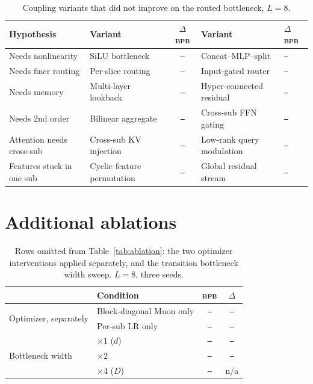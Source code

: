 \documentclass{article}
\newcommand{\PH}{{\color{red}\texttt{--}}}   %
\newcommand{\bpb}{\textsc{bpb}}
\newcommand{\dmodel}{D}
\newcommand{\dsub}{d}
\begin{document}
\begin{table}[h]
\caption{Coupling variants that did not improve on the routed bottleneck, $L{=}8$.}
\label{tab:negative}
\begin{center}
\begin{small}
\setlength{\tabcolsep}{4pt}
\begin{tabular}{llcll}
\toprule
Hypothesis & Variant & $\Delta$ \bpb & Variant & $\Delta$ \bpb \\
\midrule
Needs nonlinearity   & SiLU bottleneck & \PH & Concat--MLP--split & \PH \\
Needs finer routing  & Per-slice routing & \PH & Input-gated router & \PH \\
Needs memory         & Multi-layer lookback & \PH & Hyper-connected residual & \PH \\
Needs 2nd order      & Bilinear aggregate & \PH & Cross-sub FFN gating & \PH \\
Attention needs cross-sub & Cross-sub KV injection & \PH & Low-rank query modulation & \PH \\
Features stuck in one sub & Cyclic feature permutation & \PH & Global residual stream & \PH \\
\bottomrule
\end{tabular}
\end{small}
\end{center}
\end{table}

\section{Additional ablations}
\label{app:extra}

\begin{table}[h]
\caption{Rows omitted from Table~\ref{tab:ablation}: the two optimizer
interventions applied separately, and the transition bottleneck width sweep.
$L{=}8$, three seeds.}
\begin{center}
\begin{small}
\begin{tabular}{llcc}
\toprule
& Condition & \bpb & $\Delta$ \\
\midrule
\multirow{2}{*}{Optimizer, separately}
 & Block-diagonal Muon only & \PH & \PH \\
 & Per-sub LR only          & \PH & \PH \\
\midrule
\multirow{3}{*}{Bottleneck width}
 & $\times 1$ ($\dsub$)   & \PH & \PH \\
 & $\times 2$             & \PH & \PH \\
 & $\times 4$ ($\dmodel$) & \PH & n/a \\
\bottomrule
\end{tabular}
\end{small}
\end{center}
\end{table}
\end{document}
